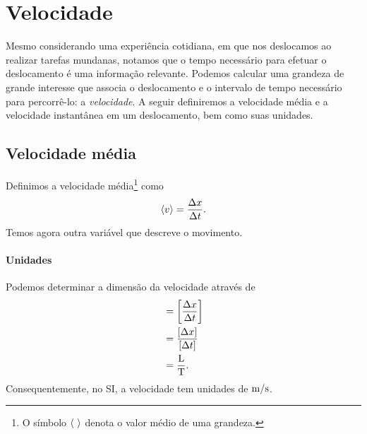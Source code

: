 \section{Velocidade}

Mesmo considerando uma experiência cotidiana, em que nos deslocamos ao realizar tarefas mundanas, notamos que o tempo necessário para efetuar o deslocamento é uma informação relevante. Podemos calcular uma grandeza de grande interesse que associa o deslocamento e o intervalo de tempo necessário para percorrê-lo: a \emph{velocidade}. A seguir definiremos a velocidade média e a velocidade instantânea em um deslocamento, bem como suas unidades.

\subsection{Velocidade média}

 Definimos a velocidade média\footnote{O símbolo $\left\langle{~}\right\rangle$ denota o valor médio de uma grandeza.} como
\begin{equation}
  \left\langle{v}\right\rangle = \frac{\Delta x}{\Delta t}.
\end{equation}
%
Temos agora outra variável que descreve o movimento. 

\paragraph{Unidades}

Podemos determinar a dimensão da velocidade através de
\begin{align}
    [\mean{v}] &= \left[\frac{\Delta x}{\Delta t}\right] \\
    &= \frac{[\Delta x]}{[\Delta t]} \\
    &= \frac{\rm{L}}{\rm{T}}.
\end{align}
%
Consequentemente, no SI, a velocidade tem unidades de $\rm{m}/\rm{s}$.


